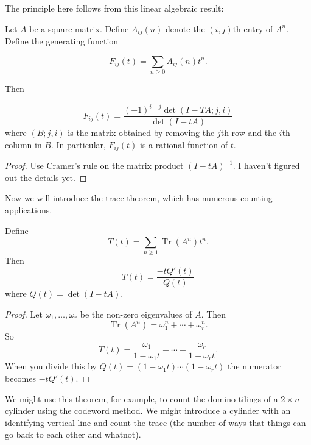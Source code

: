 The principle here follows from this linear algebraic result:
\begin{theorem}
Let $A$ be a square matrix. Define $A_{ij}(n)$ denote the $(i, j)$th entry of $A^n$. Define the generating function

\[F_{ij}(t) = \sum_{n \geq 0}A_{ij}(n)t^n.\]

Then 

\[F_{ij}(t) = \frac{(-1)^{i + j}\det(I - TA;j, i)}{\det(I - tA)}\]
where $(B;j, i)$ is the matrix obtained by removing the $j$th row and the $i$th column in $B$. In particular, $F_{ij}(t)$ is a rational function of $t$.
\end{theorem}
\begin{proof}
Use Cramer's rule on the matrix product $(I - tA)^{-1}$. I haven't figured out the details yet.
\end{proof}

Now we will introduce the trace theorem, which has numerous counting applications.

\begin{theorem}
Define
\[T(t) = \sum_{n \geq 1} \operatorname{Tr}(A^n)t^n.\]
Then 
\[T(t) = \frac{-tQ'(t)}{Q(t)}\] where $Q(t) = \det(I - tA)$.
\end{theorem}
\begin{proof}
Let $\omega_1, \dots, \omega_r$ be the non-zero eigenvalues of $A$. Then
\[\operatorname{Tr}(A^n) = \omega_1^n + \cdots + \omega_r^n.\] So
\[T(t) = \frac{\omega_1}{1 - \omega_1t} + \cdots + \frac{\omega_r}{1 - \omega_rt}.\]
When you divide this by $Q(t) = (1 - \omega_1t)\cdots(1 - \omega_rt)$ the numerator becomes $-tQ'(t)$.
\end{proof}

We might use this theorem, for example, to count the domino tilings of a $2\times n$ cylinder using the codeword method. We might introduce a cylinder with an identifying vertical line and count the trace (the number of ways that things can go back to each other and whatnot).

